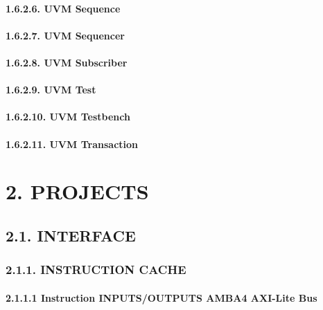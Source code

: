 \documentclass[]{article}
\let\oldparagraph\paragraph
\renewcommand{\paragraph}[1]{\oldparagraph{#1}\mbox{}}
\begin{document}
\paragraph{1.6.2.6. UVM Sequence}\label{uvm-sequence}

\paragraph{1.6.2.7. UVM Sequencer}\label{uvm-sequencer}

\paragraph{1.6.2.8. UVM Subscriber}\label{uvm-subscriber}

\paragraph{1.6.2.9. UVM Test}\label{uvm-test}

\paragraph{1.6.2.10. UVM Testbench}\label{uvm-testbench}

\paragraph{1.6.2.11. UVM Transaction}\label{uvm-transaction}

\section{2. PROJECTS}\label{projects}

\subsection{2.1. INTERFACE}\label{interface}

\subsubsection{2.1.1. INSTRUCTION CACHE}\label{instruction-cache}

\paragraph{2.1.1.1 Instruction INPUTS/OUTPUTS AMBA4 AXI-Lite
Bus}\label{instruction-inputsoutputs-amba4-axi-lite-bus}
\end{document}
